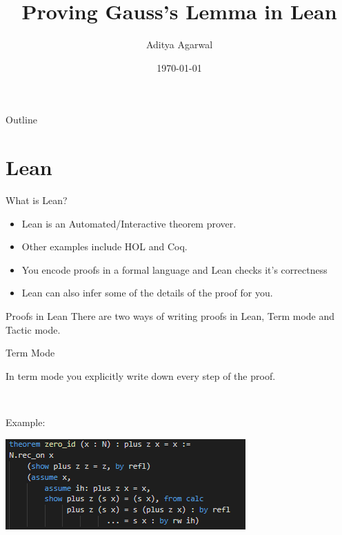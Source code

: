 \documentclass{beamer}
\begin{document}
\title{Proving Gauss's Lemma in Lean}

\author{Aditya Agarwal}


\date{\today}

\begin{frame}
  \titlepage
\end{frame}


\begin{frame}{Outline}
  \tableofcontents
\end{frame}

\section {Lean}

\begin{frame}{What is Lean?} 
    \begin{itemize}
        \item Lean is an Automated/Interactive theorem prover.
        \item Other examples include HOL and Coq.
        \item You encode proofs in a formal language and Lean checks it's correctness
        \item Lean can also infer some of the details of the proof for you.
    \end{itemize}         
\end{frame}

\begin{frame}{Proofs in Lean} 
  There are two ways of writing proofs in Lean, Term mode and Tactic mode. 

\end{frame}


\begin{frame}{Term Mode} 

  In term mode you explicitly write down every step of the proof. 

  \

  Example:

  \includegraphics{term_example.png}

\end{frame}
\end{document}

